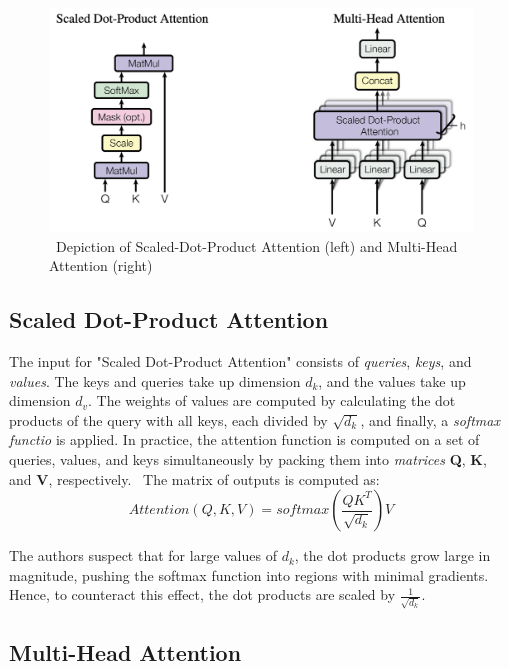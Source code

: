 \begin{figure}
    \centering
    \includegraphics[width=\textwidth]{assets/attention}
    \caption{~Depiction of Scaled-Dot-Product Attention (left) and Multi-Head Attention (right)~\cite{attention-is-all-you-need}}\label{fig:attention}
\end{figure}

\subsection{Scaled Dot-Product Attention}\label{subsec:scaled-dot-product-attention}

The input for "Scaled Dot-Product Attention" consists of \textit{queries}, \textit{keys}, and \textit{values}.
The keys and queries take up dimension $d_k$, and the values take up dimension $d_v$.
The weights of values are computed by calculating the dot products of the query with all keys, each divided by $\sqrt{d_k}$, and finally, a \textit{softmax functio} is applied.
In practice, the attention function is computed on a set of queries, values, and keys simultaneously by packing them into \textit{matrices} \textbf{Q}, \textbf{K}, and \textbf{V}, respectively.~\cite{attention-is-all-you-need}
The matrix of outputs is computed as: \[ Attention(Q, K, V ) = softmax( \frac{QK^T}{\sqrt{d_k}}) V \]

The authors suspect that for large values of $d_k$, the dot products grow large in magnitude, pushing the softmax function into regions with minimal gradients.
Hence, to counteract this effect, the dot products are scaled by $\frac{1}{\sqrt{d_k}}$.~\cite{attention-is-all-you-need}

\subsection{Multi-Head Attention}\label{subsec:multi-head-attention}

